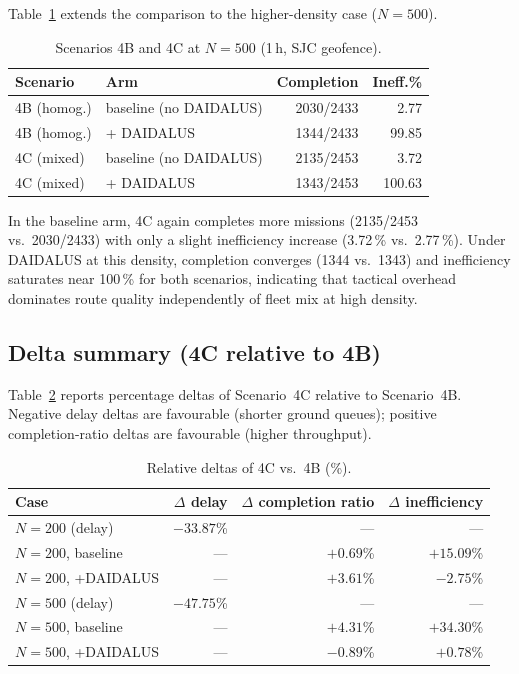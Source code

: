 Table~\ref{tab:scen4c_n500} extends the comparison to the higher-density case ($N=500$).

\begin{table}[htbp]
\caption{Scenarios 4B and 4C at $N=500$ (1\,h, SJC geofence).}
\label{tab:scen4c_n500}
\begin{center}
\begin{tabular}{|l|l|r|r|}
\hline
\textbf{Scenario} & \textbf{Arm} & \textbf{Completion} & \textbf{Ineff.\%} \\
\hline
4B (homog.) & baseline (no DAIDALUS) & 2030/2433 & 2.77 \\
4B (homog.) & + DAIDALUS              & 1344/2433 & 99.85 \\
4C (mixed)  & baseline (no DAIDALUS) & 2135/2453 & 3.72 \\
4C (mixed)  & + DAIDALUS              & 1343/2453 & 100.63 \\
\hline
\end{tabular}
\end{center}
\end{table}

\noindent In the baseline arm, 4C again completes more missions (2135/2453 vs.\ 2030/2433) with
only a slight inefficiency increase (3.72\,\% vs.\ 2.77\,\%). Under DAIDALUS at this density,
completion converges (1344 vs.\ 1343) and inefficiency saturates near 100\,\% for both scenarios,
indicating that tactical overhead dominates route quality independently of fleet mix at high
density.

\subsection{Delta summary (4C relative to 4B)}

Table~\ref{tab:scen4c_delta_summary} reports percentage deltas of Scenario~4C relative to
Scenario~4B. Negative delay deltas are favourable (shorter ground queues); positive
completion-ratio deltas are favourable (higher throughput).

\begin{table}[htbp]
\caption{Relative deltas of 4C vs.\ 4B (\%).}
\label{tab:scen4c_delta_summary}
\begin{center}
\begin{tabular}{|l|r|r|r|}
\hline
\textbf{Case} & \textbf{$\Delta$ delay} & \textbf{$\Delta$ completion ratio} & \textbf{$\Delta$ inefficiency} \\
\hline
$N=200$ (delay)    & $-33.87$\% & --- & --- \\
$N=200$, baseline  & --- & $+0.69$\% & $+15.09$\% \\
$N=200$, +DAIDALUS & --- & $+3.61$\% & $-2.75$\% \\
$N=500$ (delay)    & $-47.75$\% & --- & --- \\
$N=500$, baseline  & --- & $+4.31$\% & $+34.30$\% \\
$N=500$, +DAIDALUS & --- & $-0.89$\% & $+0.78$\% \\
\hline
\end{tabular}
\end{center}
\end{table}

